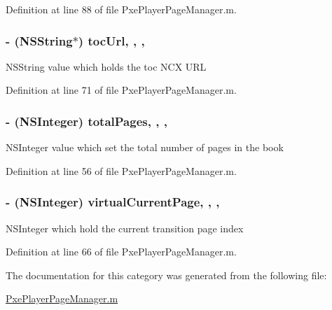 Definition at line 88 of file Pxe\-Player\-Page\-Manager.\-m.

\hypertarget{category_pxe_player_page_manager_07_08_a30a7e06d49dbb6083d1680e33cbe9935}{
\subsubsection[{toc\-Url}]{\setlength{\rightskip}{0pt plus 5cm}-\/ (N\-S\-String$\ast$) toc\-Url\hspace{0.3cm}{\ttfamily [read]}, {\ttfamily [write]}, {\ttfamily [nonatomic]}, {\ttfamily [strong]}}}\label{category_pxe_player_page_manager_07_08_a30a7e06d49dbb6083d1680e33cbe9935}
N\-S\-String value which holds the toc N\-C\-X U\-R\-L 

Definition at line 71 of file Pxe\-Player\-Page\-Manager.\-m.

\hypertarget{category_pxe_player_page_manager_07_08_adb201d14e3ca4f38e9ec2065f952c288}{
\subsubsection[{total\-Pages}]{\setlength{\rightskip}{0pt plus 5cm}-\/ (N\-S\-Integer) total\-Pages\hspace{0.3cm}{\ttfamily [read]}, {\ttfamily [write]}, {\ttfamily [nonatomic]}, {\ttfamily [assign]}}}\label{category_pxe_player_page_manager_07_08_adb201d14e3ca4f38e9ec2065f952c288}
N\-S\-Integer value which set the total number of pages in the book 

Definition at line 56 of file Pxe\-Player\-Page\-Manager.\-m.

\hypertarget{category_pxe_player_page_manager_07_08_accf769375dab7b61ec6e72229026cb9b}{
\subsubsection[{virtual\-Current\-Page}]{\setlength{\rightskip}{0pt plus 5cm}-\/ (N\-S\-Integer) virtual\-Current\-Page\hspace{0.3cm}{\ttfamily [read]}, {\ttfamily [write]}, {\ttfamily [nonatomic]}, {\ttfamily [assign]}}}\label{category_pxe_player_page_manager_07_08_accf769375dab7b61ec6e72229026cb9b}
N\-S\-Integer which hold the current transition page index 

Definition at line 66 of file Pxe\-Player\-Page\-Manager.\-m.



The documentation for this category was generated from the following file\-:\begin{DoxyCompactItemize}
\item 
\hyperlink{_pxe_player_page_manager_8m}{Pxe\-Player\-Page\-Manager.\-m}\end{DoxyCompactItemize}
